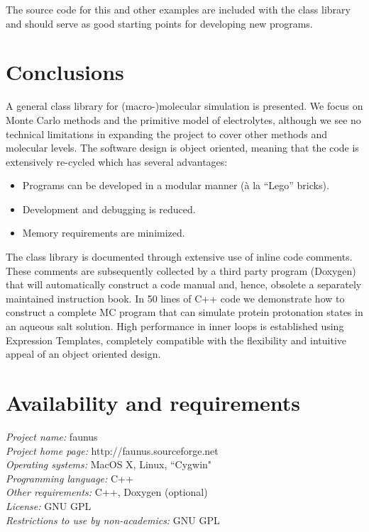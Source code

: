 \documentclass[10pt]{bmc_article}
\newenvironment{bmcformat}{\begin{raggedright}\baselineskip20pt\sloppy\setboolean{publ}{false}}{\end{raggedright}\baselineskip20pt\sloppy}
\begin{document}
\begin{bmcformat}
The source code for this and other examples are included with the class library and should serve as good starting points for developing new programs.

\section*{Conclusions}
A general class library for (macro-)molecular simulation is presented.
We focus on Monte Carlo methods and the primitive model of electrolytes, although we see no technical limitations in expanding the project to cover other methods and molecular levels.
The software design is object oriented, meaning that the code is extensively re-cycled which has several advantages:
\begin{itemize}
\item Programs can be developed in a modular manner (\`a la ``Lego'' bricks).
\item Development and debugging is reduced.
\item Memory requirements are minimized.
\end{itemize}
The class library is documented through extensive use of inline code comments.
These comments are subsequently collected by a third party program (Doxygen) that will automatically construct a code manual and, hence, obsolete a separately maintained instruction book.
In 50 lines of C++ code we demonstrate how to construct a complete MC program that can simulate protein protonation states in an aqueous salt solution.
High performance in inner loops is established using Expression Templates, completely compatible with the flexibility and intuitive appeal of an object oriented design.

\section*{Availability and requirements}
\textsl{Project name:} faunus\\
\textsl{Project home page:} http://faunus.sourceforge.net\\
\textsl{Operating systems:} MacOS X, Linux, ``Cygwin"\\
\textsl{Programming language:} C++\\
\textsl{Other requirements:} C++, Doxygen (optional)\\
\textsl{License:} GNU GPL\\
\textsl{Restrictions to use by non-academics:} GNU GPL\\


\end{bmcformat}
\end{document}
